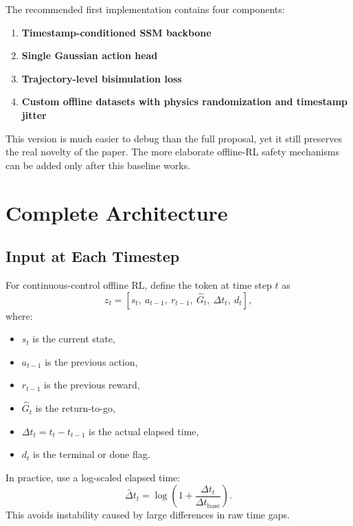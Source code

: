 \documentclass[11pt]{article}
\begin{document}
The recommended first implementation contains four components:
\begin{enumerate}[leftmargin=1.5em]
    \item \textbf{Timestamp-conditioned SSM backbone}
    \item \textbf{Single Gaussian action head}
    \item \textbf{Trajectory-level bisimulation loss}
    \item \textbf{Custom offline datasets with physics randomization and timestamp jitter}
\end{enumerate}

This version is much easier to debug than the full proposal, yet it still preserves the real novelty of the paper. The more elaborate offline-RL safety mechanisms can be added only after this baseline works.

\section{Complete Architecture}

\subsection{Input at Each Timestep}
For continuous-control offline RL, define the token at time step $t$ as
\[
 z_t = [s_t,\ a_{t-1},\ r_{t-1},\ \widehat{G}_t,\ \Delta t_t,\ d_t],
\]
where:
\begin{itemize}[leftmargin=1.5em]
    \item $s_t$ is the current state,
    \item $a_{t-1}$ is the previous action,
    \item $r_{t-1}$ is the previous reward,
    \item $\widehat{G}_t$ is the return-to-go,
    \item $\Delta t_t = t_t - t_{t-1}$ is the actual elapsed time,
    \item $d_t$ is the terminal or done flag.
\end{itemize}

In practice, use a log-scaled elapsed time:
\[
\widetilde{\Delta t}_t = \log\!\left(1 + \frac{\Delta t_t}{\Delta t_{\text{base}}}\right).
\]
This avoids instability caused by large differences in raw time gaps.
\end{document}
